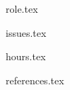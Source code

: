 \documentclass[a4paper,11pt]{article}
\begin{document}

{role.tex}



{issues.tex}





{hours.tex}

{references.tex}
\end{document}
